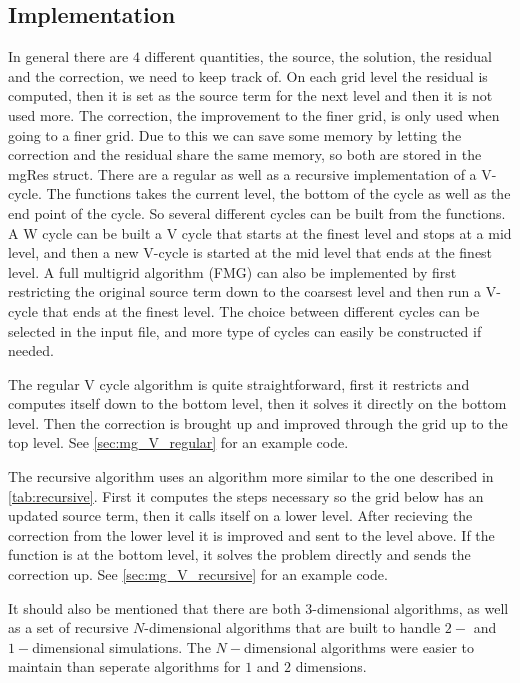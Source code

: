 
\subsection{Implementation}
	In general there are \(4\) different quantities, the source, the solution, the residual and the correction, we need to keep track of.
	On each grid level the residual is computed, then it is set as the source term for the next level and then it is not used more.
	The correction, the improvement to the finer grid, is only used when going to a finer grid. Due to this we can save some memory by
	letting the correction and the residual share the same memory, so both are stored in the mgRes struct. There are a regular as well as a recursive implementation
	of a V-cycle. The functions takes the current level, the bottom of the cycle as well as the end point of the cycle. So several different cycles
	can be built from the functions. A W cycle can be built a V cycle that starts at the finest level and stops at a mid level, and then a new V-cycle is started at
	the mid level that ends at the finest level. A full multigrid algorithm (FMG) can also be implemented by first restricting the original source term down to the coarsest
	level and then run a V-cycle that ends at the finest level. The choice between different cycles can be selected in the input file,
	and more type of cycles can easily be constructed if needed.

	The regular V cycle algorithm is quite straightforward, first it restricts and computes itself down to the bottom level,
	then it solves it directly on the bottom level. Then the correction is brought up and improved through the grid up to the top level.
	See \cref{sec:mg_V_regular} for an example code.

	The recursive algorithm uses an algorithm more similar to the one described in \cref{tab:recursive}. First it computes the steps necessary
	so the grid below has an updated source term, then it calls itself on a lower level. After recieving the correction from
	the lower level it is improved and sent to the level above. If the function is at the bottom level, it solves the problem directly and sends
	the correction up. See \cref{sec:mg_V_recursive} for an example code.

	It should also be mentioned that there are both \(3\)-dimensional algorithms, as well as a set of recursive \(N\)-dimensional algorithms
	that are built to handle \(2-\) and \(1-\)dimensional simulations. The \(N-\)dimensional algorithms were easier to maintain than seperate algorithms
	for \(1\) and \(2\) dimensions. 

